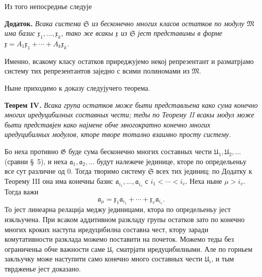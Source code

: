 ﻿\documentclass[11pt]{article}
\providecommand{\mM}{\mathfrak M}
\providecommand{\mG}{\mathfrak G}
\providecommand{\mS}{\mathfrak S}
\providecommand{\mU}{\mathfrak U}
\providecommand{\ma}{\mathfrak a}
\providecommand{\mx}{\mathfrak x}
\begin{document}
Из того непосреднье следује

\textbf{Додаток.} \textit{Всака система \(\mS\) из бесконечно многих класов остатков по модулу \(\mM\) има базис \(\mx_1,\ldots,\mx_k\), тако же всакы \(\mx\) из \(\mS\) јест представимы в форме \(\mx=A_1\mx_1+\cdots+A_k\mx_k\).}

Именно, всакому класу остатков приреджујемо некој репрезентант и разматрјамо систему тих репрезентантов заједно с всими полиномами из \(\mM\).

Ныне приходимо к доказу следујучего теорема.

\textbf{Теорем IV.} \textit{Всака група остатков може быти представльена како сума конечно многих иредуцибилных составных чести; теды по Теорему II всакы модул може быти представјен како најмене обче многократно конечно многих иредуцибилных модулов, кторе творе тотално взаимно просту систему.}

Бо неха противно \(\mG\) буде сума бесконечно многих составных чести \(\mU_1,\mU_2,\ldots\) (сравни \S~5), и неха \(\ma_1,\ma_2,\ldots\) будут належече јединице, кторе по определьеньу все сут различне од \(0\). Тогда творимо систему \(\mS\) всех тих јединиц; по Додатку к Теорему III она има конечны базис \(\ma_{i_1},\ldots,\ma_{i_v}\) с \(i_1<\cdots<i_v\). Неха ныне \(\mu>i_v\). Тогда важи
\[
 \ma_\mu=\mx_1\ma_{i_1}+\cdots+\mx_v\ma_{i_v}.
\]
То јест линеарна релација меджу јединицами, ктора по определьеньу јест изкльучена. При всаком аддитивном разкладу групы остатков зато по конечно многих кроких наступа иредуцибилна составна чест, ктору заради комутативности разклада можемо поставити на почеток. Можемо теды без ограниченьа обче важности саме \(\mU_i\) сматрјати иредуцибилными. Але по горньем закльучку може наступити само конечно много составных чести \(\mU_i\), и тым тврдженье јест доказано.
\end{document}
